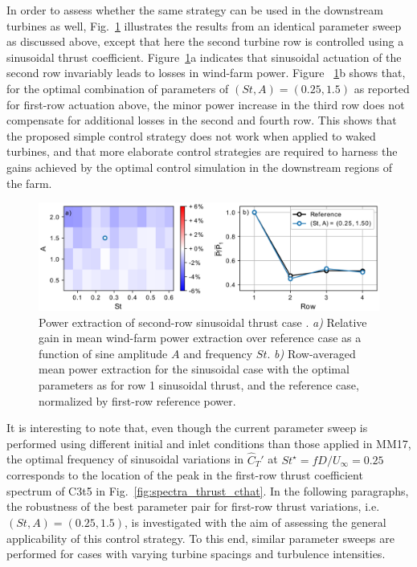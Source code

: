 \documentclass[wes, manuscript]{copernicus}
\newcommand{\cthat}{\widehat{C}_T'}
\begin{document}
In order to assess whether the same strategy can be used in the downstream turbines as well, Fig.~\ref{fig:sinus_row2} illustrates the results from an identical parameter sweep as discussed above, except that here the second turbine row is controlled using a sinusoidal thrust coefficient. Figure~\ref{fig:sinus_row2}a indicates that sinusoidal actuation of the second row invariably leads to losses in wind-farm power. Figure ~\ref{fig:sinus_row2}b  shows that, for the optimal combination of parameters of  $(St, A) = (0.25, 1.5)$ as reported for first-row actuation above, the minor power increase in the third row does not compensate for additional losses in the second and fourth row. This shows that the proposed simple control strategy does not work when applied to waked turbines, and that more elaborate control strategies are required to harness the gains achieved by the optimal control simulation in the downstream regions of the farm. 
\begin{figure}
	\centering
	\includegraphics[width=\textwidth]{gains_row22.eps}
	\caption{Power extraction of second-row sinusoidal thrust case . \emph{a) } Relative gain in mean wind-farm power extraction over reference case as a function of sine amplitude $A$ and frequency $St$. \emph{b) } Row-averaged mean power extraction for the sinusoidal case with the optimal parameters as for row 1 sinusoidal thrust, and the reference case, normalized by first-row reference power.\label{fig:sinus_row2} }
\end{figure}

It is interesting to note that, even though the current parameter sweep is performed using different initial and inlet conditions than those applied in MM17, the optimal frequency of sinusoidal variations in $\cthat$ at $St^\star = f D / U_\infty = 0.25$ corresponds to the location of the peak in the first-row thrust coefficient spectrum of C3t5 in Fig.~\ref{fig:spectra_thrust_cthat}. In the following paragraphs, the robustness of the best parameter pair for first-row thrust variations, i.e. $(St, A) = (0.25, 1.5)$, is investigated with the aim of assessing the general applicability of this control strategy. To this end, similar parameter sweeps are performed for cases with varying turbine spacings and turbulence intensities.
\end{document}
